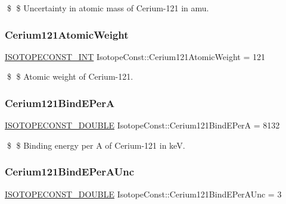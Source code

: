 \$ \$ Uncertainty in atomic mass of Cerium-\/121 in amu. \mbox{\label{group___isotope_const-_cerium-_ce121_ga97d51ca691dbd4b71b32864537abbd2c}} 
\subsubsection{\texorpdfstring{Cerium121\+Atomic\+Weight}{Cerium121AtomicWeight}}
{\footnotesize\ttfamily \mbox{\hyperlink{group___isotope_const-_macros_ga5f18360b3e99483a35c32d789e62621c}{I\+S\+O\+T\+O\+P\+E\+C\+O\+N\+S\+T\+\_\+\+I\+NT}} Isotope\+Const\+::\+Cerium121\+Atomic\+Weight = 121}

\$ \$ Atomic weight of Cerium-\/121. \mbox{\label{group___isotope_const-_cerium-_ce121_ga8afcbc0a6e7eb03eb4806e23d79fcba0}} 
\subsubsection{\texorpdfstring{Cerium121\+Bind\+E\+PerA}{Cerium121BindEPerA}}
{\footnotesize\ttfamily \mbox{\hyperlink{group___isotope_const-_macros_ga8f45a7272ce02c0b4c65c44636ed719a}{I\+S\+O\+T\+O\+P\+E\+C\+O\+N\+S\+T\+\_\+\+D\+O\+U\+B\+LE}} Isotope\+Const\+::\+Cerium121\+Bind\+E\+PerA = 8132}

\$ \$ Binding energy per A of Cerium-\/121 in keV. \mbox{\label{group___isotope_const-_cerium-_ce121_ga427b4579159a80aa5567e05121974cb8}} 
\subsubsection{\texorpdfstring{Cerium121\+Bind\+E\+Per\+A\+Unc}{Cerium121BindEPerAUnc}}
{\footnotesize\ttfamily \mbox{\hyperlink{group___isotope_const-_macros_ga8f45a7272ce02c0b4c65c44636ed719a}{I\+S\+O\+T\+O\+P\+E\+C\+O\+N\+S\+T\+\_\+\+D\+O\+U\+B\+LE}} Isotope\+Const\+::\+Cerium121\+Bind\+E\+Per\+A\+Unc = 3}

